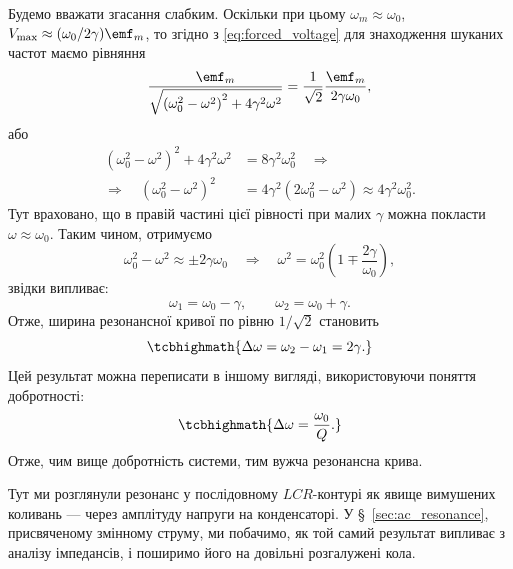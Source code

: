 Будемо вважати згасання слабким. Оскільки при цьому $\omega_m \approx \omega_0$,
$V_{\max} \approx (\omega_0/2\gamma)\emf_m$, то згідно з \eqref{eq:forced_voltage} для знаходження шуканих частот маємо рівняння
\begin{equation}\label{eq:half_power_equation}
	\frac{\emf_m}{\sqrt{\left(\omega_0^2 - \omega^2\right)^2 + 4\gamma^2\omega^2}}
	= \frac{1}{\sqrt{2}}\frac{\emf_m}{2\gamma\omega_0},
\end{equation}
або
\begin{equation}\label{eq:half_power_squared}
	\begin{aligned}
		\left(\omega_0^2 - \omega^2\right)^2 + 4\gamma^2\omega^2 & = 8\gamma^2\omega_0^2 \quad\Rightarrow                                      \\
		\Rightarrow\quad \left(\omega_0^2 - \omega^2\right)^2    & = 4\gamma^2\left(2\omega_0^2 - \omega^2\right) \approx 4\gamma^2\omega_0^2.
	\end{aligned}
\end{equation}
Тут враховано, що в правій частині цієї рівності при малих $\gamma$ можна
покласти $\omega \approx \omega_0$. Таким чином, отримуємо
\begin{equation}\label{eq:frequency_shift}
	\omega_0^2 - \omega^2 \approx \pm 2\gamma\omega_0
	\quad\Rightarrow\quad
	\omega^2 = \omega_0^2\left(1 \mp \frac{2\gamma}{\omega_0}\right),
\end{equation}
звідки випливає:
\begin{equation}\label{eq:omega1_omega2}
	\omega_1 = \omega_0 - \gamma, \qquad \omega_2 = \omega_0 + \gamma.
\end{equation}
Отже, ширина резонансної кривої по рівню $1/\sqrt{2}$ становить
\begin{equation}\label{eq:resonance_width}
	\tcbhighmath{
		\Delta\omega = \omega_2 - \omega_1 = 2\gamma.
	}
\end{equation}
Цей результат можна переписати в іншому вигляді, використовуючи поняття
добротності:
\begin{equation}\label{eq:resonance_width_Q}
	\tcbhighmath{
		\Delta\omega = \frac{\omega_0}{Q}.
	}
\end{equation}
Отже, чим вище добротність системи, тим вужча резонансна
крива.

Тут ми розглянули резонанс у послідовному $LCR$-контурі як явище вимушених коливань --- через амплітуду напруги на конденсаторі. У \S~\ref{sec:ac_resonance}, присвяченому змінному струму, ми побачимо, як той самий результат випливає з аналізу імпедансів, і поширимо його на довільні розгалужені кола.

